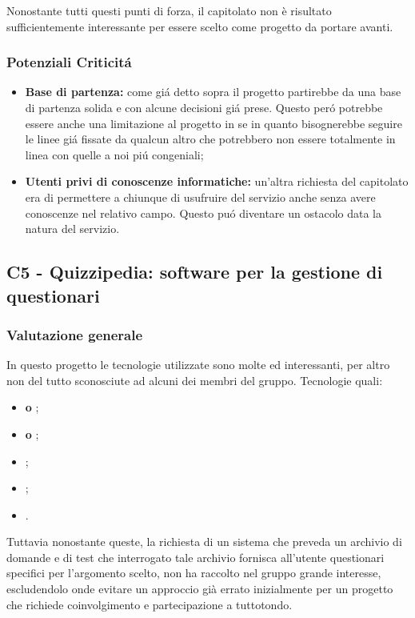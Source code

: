 Nonostante tutti questi punti di forza, il capitolato non è risultato sufficientemente interessante per essere scelto come progetto da portare avanti.

\subsubsection{Potenziali Criticit\'a}

\begin{itemize}
	\item \textbf{Base di partenza:} come gi\'a detto sopra il progetto partirebbe da una base di partenza solida e con alcune decisioni gi\'a prese. Questo per\'o potrebbe essere anche una limitazione al progetto in se in quanto bisognerebbe seguire le linee gi\'a fissate da qualcun altro che potrebbero non essere totalmente in linea con quelle a noi pi\'u congeniali;
\end{itemize}

\begin{itemize}
	\item \textbf{Utenti privi di conoscenze informatiche:} un'altra richiesta del capitolato era di permettere a chiunque di usufruire del servizio anche senza avere conoscenze nel relativo campo. Questo pu\'o diventare un ostacolo data la natura del servizio.
\end{itemize}


\subsection{C5 - Quizzipedia: software per la gestione di questionari}
\subsubsection{Valutazione generale}
In questo progetto le tecnologie utilizzate sono molte ed interessanti, per altro non del tutto sconosciute ad alcuni dei membri del gruppo.
Tecnologie quali:
 \begin{itemize}
	\item \textbf{ o };
	\item\textbf{ o };
	\item \textbf{};
	\item \textbf{};
	\item \textbf{}.
\end{itemize}
Tuttavia nonostante queste, la richiesta di un sistema che preveda un archivio di domande e di test che interrogato tale archivio fornisca all'utente questionari specifici per l'argomento scelto, non ha raccolto nel gruppo grande interesse, escludendolo onde evitare un approccio gi\`a errato inizialmente per un progetto che richiede coinvolgimento e partecipazione a tuttotondo.

